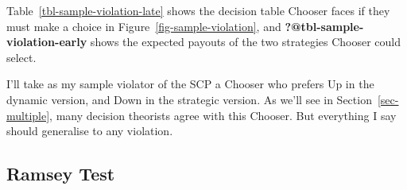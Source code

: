 \documentclass[
  10pt,
  letterpaper,
  DIV=11,
  numbers=noendperiod,
  twoside]{scrartcl}
\begin{document}
Table~\ref{tbl-sample-violation-late} shows the decision table Chooser
faces if they must make a choice in Figure~\ref{fig-sample-violation},
and \textbf{?@tbl-sample-violation-early} shows the expected payouts of
the two strategies Chooser could select.

\begin{table}

\caption{\label{tbl-sample-violation}Payout tables for
Figure~\ref{fig-sample-violation}.}

\begin{minipage}[t]{0.50\linewidth}



\end{minipage}%
%
\begin{minipage}[t]{0.50\linewidth}



\end{minipage}%

\end{table}%

I'll take as my sample violator of the SCP a Chooser who prefers Up in
the dynamic version, and Down in the strategic version. As we'll see in
Section~\ref{sec-multiple}, many decision theorists agree with this
Chooser. But everything I say should generalise to any violation.

\subsection{Ramsey Test}\label{sec-ramsey}
\end{document}
